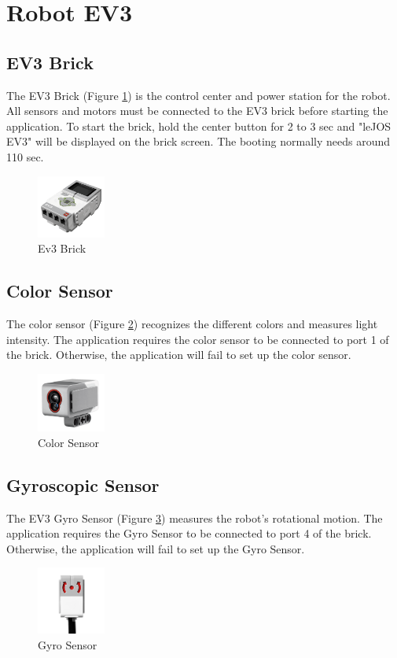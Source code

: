\documentclass[12pt,a4paper]{article}
\begin{document}
\newpage
\section{Robot EV3}
\subsection{EV3 Brick} 
The EV3 Brick (Figure \ref{brick}) is the control center and power station for the robot. All sensors and motors must be connected to the EV3 brick before starting the application. To start the brick, hold the center button for 2 to 3 sec and "leJOS EV3" will be displayed on the brick screen. The booting normally needs around 110 sec. \\
\begin{figure}[!htb]
\centering
\includegraphics[width=0.2\textwidth]{Ev3Brick.png}
\caption{Ev3 Brick}
\label{brick}
\end{figure}

\subsection{Color Sensor} 
The color sensor (Figure \ref{color}) recognizes the different colors and measures light intensity. The application requires the color sensor to be connected to port 1 of the brick. Otherwise, the application will fail to set up the color sensor.
\begin{figure}[!htb]
\centering
\includegraphics[width=0.2\textwidth]{ColorSensor.png}
\caption{Color Sensor}
\label{color}
\end{figure}

\subsection{Gyroscopic Sensor} 
The EV3 Gyro Sensor (Figure \ref{gyro}) measures the robot’s rotational motion. The application requires the Gyro Sensor to be connected to port 4 of the brick. Otherwise, the application will fail to set up the Gyro Sensor.
\begin{figure}[!htb]
\centering
\includegraphics[width=0.2\textwidth]{GyroSensor.png}
\caption{Gyro Sensor}
\label{gyro}
\end{figure}
\newpage
\end{document}
